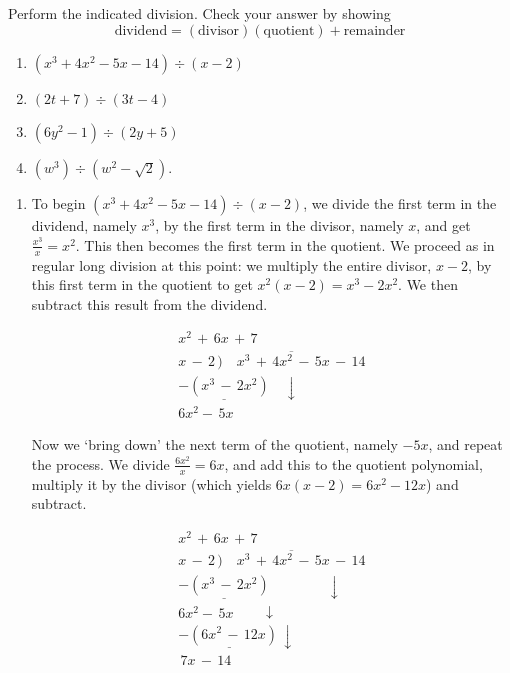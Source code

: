 \documentclass{ximera}
\begin{document}
\begin{example}\label{polynomiallongdivex}  Perform the indicated division.  Check your answer by showing \[\text{dividend} = (\text{divisor})( \text{quotient}) + \text{remainder}\]


\begin{enumerate}

\item  $\left(x^3 + 4x^2 - 5x - 14\right) \div (x-2)$

\item  $\left(2t +  7\right) \div \left(3t - 4\right)$


\item  $\left(6y^2 - 1 \right) \div \left(2y + 5\right)$

\item  $\left(w^3 \right) \div \left(w^2 - \sqrt{2}\right)$.

\setcounter{HW}{\value{enumi}}

\end{enumerate}

\begin{explanation}

\begin{enumerate}

\item  To begin $\left(x^3 + 4x^2 - 5x - 14\right) \div (x-2)$, we divide the first term in the dividend, namely $x^3$, by the first term in the divisor, namely $x$, and get $\frac{x^3}{x} = x^2$. This then becomes the first term in the quotient.  We proceed as in regular long division at this point: we multiply the entire divisor, $x-2$, by this first term in the quotient to get $x^{2}(x - 2) = x^3 - 2x^2$.  We then subtract this result from the dividend.

\[
\begin{array}{r}
x^2\,+\,6x\,+\,7\\
x\,-\,2 \, \overline{)\quad x^3\,+\,4x^2\,-\,5x\,-\,14} \\
 \underline{-\left(x^3\,-\,2x^2\right)}\quad\downarrow \phantom{\,-2\,14}\\
 6x^2-\,5x\phantom{\,-\,14\,}
\end{array}
\]

Now we `bring down' the next term of the quotient, namely $-5x$, and repeat the process. We divide $\frac{6x^2}{x} = 6x$, and add this to the quotient polynomial, multiply it by the divisor (which yields $6x(x - 2) = 6x^{2} - 12x$) and subtract. 

\[
\begin{array}{r}
x^2\,+\,6x\,+\,7\\
x\,-\,2 \, \overline{)\quad x^3\,+\,4x^2\,-\,5x\,-\,14} \\
 \underline{-\left(x^3\,-\,2x^2\right)} \phantom{-\,5x\,-\,1}\downarrow\\
 6x^2-\,5x\phantom{\,-\,1}\downarrow\\
  \underline{-\left(6x^2\,-\,12x\right)\,}\downarrow\\
  \,7x\,-\,14 
\end{array}
\]


\end{enumerate}
\end{explanation}
\end{example}
\end{document}
